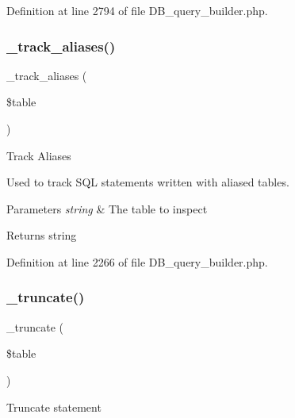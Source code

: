 Definition at line 2794 of file D\+B\+\_\+query\+\_\+builder.\+php.

\mbox{\label{class_c_i___d_b__query__builder_afb539c1557a7cb20a190f5b68d96b74a}} 
\subsubsection{\texorpdfstring{\_track\_aliases()}{\_track\_aliases()}}
{\footnotesize\ttfamily \+\_\+track\+\_\+aliases (\begin{DoxyParamCaption}\item[{}]{\$table }\end{DoxyParamCaption})\hspace{0.3cm}{\ttfamily [protected]}}

Track Aliases

Used to track S\+QL statements written with aliased tables.


\begin{DoxyParams}{Parameters}
{\em string} & The table to inspect \\
\hline
\end{DoxyParams}
\begin{DoxyReturn}{Returns}
string 
\end{DoxyReturn}


Definition at line 2266 of file D\+B\+\_\+query\+\_\+builder.\+php.

\mbox{\label{class_c_i___d_b__query__builder_aa029600528fc1ce660a23ff4b4667f95}} 
\subsubsection{\texorpdfstring{\_truncate()}{\_truncate()}}
{\footnotesize\ttfamily \+\_\+truncate (\begin{DoxyParamCaption}\item[{}]{\$table }\end{DoxyParamCaption})\hspace{0.3cm}{\ttfamily [protected]}}

Truncate statement

